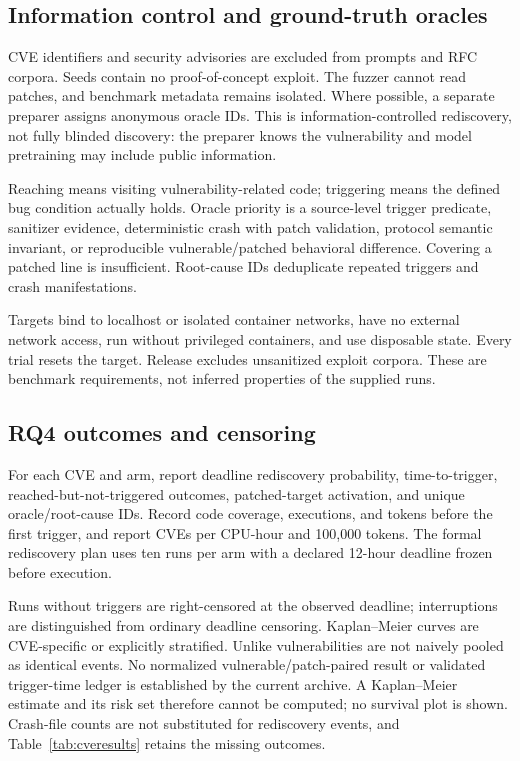 \documentclass[final,5p,times,number]{elsarticle}
\begin{document}
\subsection{Information control and ground-truth oracles}
CVE identifiers and security advisories are excluded from prompts and RFC corpora. Seeds contain no proof-of-concept exploit. The fuzzer cannot read patches, and benchmark metadata remains isolated. Where possible, a separate preparer assigns anonymous oracle IDs. This is information-controlled rediscovery, not fully blinded discovery: the preparer knows the vulnerability and model pretraining may include public information.

Reaching means visiting vulnerability-related code; triggering means the defined bug condition actually holds. Oracle priority is a source-level trigger predicate, sanitizer evidence, deterministic crash with patch validation, protocol semantic invariant, or reproducible vulnerable/patched behavioral difference. Covering a patched line is insufficient. Root-cause IDs deduplicate repeated triggers and crash manifestations.

Targets bind to localhost or isolated container networks, have no external network access, run without privileged containers, and use disposable state. Every trial resets the target. Release excludes unsanitized exploit corpora. These are benchmark requirements, not inferred properties of the supplied runs.

\subsection{RQ4 outcomes and censoring}
For each CVE and arm, report deadline rediscovery probability, time-to-trigger, reached-but-not-triggered outcomes, patched-target activation, and unique oracle/root-cause IDs. Record code coverage, executions, and tokens before the first trigger, and report CVEs per CPU-hour and 100,000 tokens. The formal rediscovery plan uses ten runs per arm with a declared 12-hour deadline frozen before execution.

Runs without triggers are right-censored at the observed deadline; interruptions are distinguished from ordinary deadline censoring. Kaplan--Meier curves are CVE-specific or explicitly stratified. Unlike vulnerabilities are not naively pooled as identical events. No normalized vulnerable/patch-paired result or validated trigger-time ledger is established by the current archive. A Kaplan--Meier estimate and its risk set therefore cannot be computed; no survival plot is shown. Crash-file counts are not substituted for rediscovery events, and Table~\ref{tab:cveresults} retains the missing outcomes.
\end{document}
